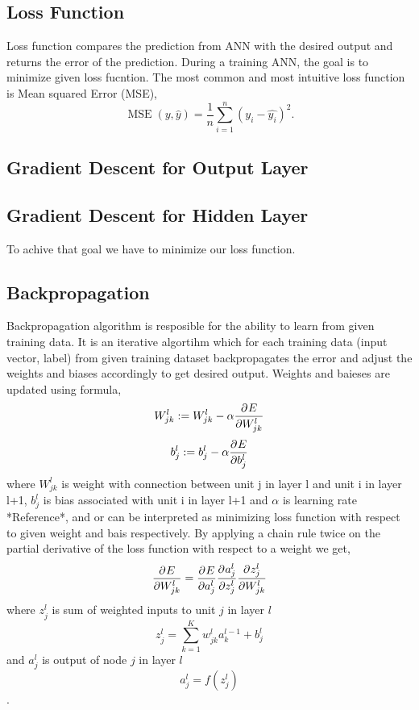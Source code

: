 \subsection{Loss Function}

Loss function compares the prediction from ANN with the desired output and returns the error of the prediction.
During a training ANN, the goal is to minimize given loss fucntion.
The most common and most intuitive loss function is Mean squared Error (MSE),
\[ \operatorname{MSE}(y, \hat{y}) = \frac{1}{n}\sum_{i=1}^n(y_i-\hat{y_i})^2. \]


\subsection{Gradient Descent for Output Layer}



\subsection{Gradient Descent for Hidden Layer}
To achive that goal we have to minimize our loss function.


\subsection{Backpropagation}

Backpropagation algorithm is resposible for the ability to learn from given training data.
It is an iterative algortihm which for each training data (input vector, label) from given training dataset backpropagates the error and adjust the weights and biases accordingly to get desired output.
\newline
Weights and baieses are updated using formula,
\[  W_{jk}^l := W_{jk}^l - \alpha\frac{\partial^{} E}{\partial W_{jk}^l} \]
\[ b_j^l := b_j^l - \alpha\frac{\partial^{} E}{\partial b_j^l} \]
where $W_{jk}^l$ is weight with connection between unit j in layer l and unit i in layer l+1, $b_j^l$ is bias associated with unit
i in layer l+1 and $\alpha$ is learning rate *Reference*, and  or  can be interpreted as minimizing loss function with respect to given weight and bais respectively.\newline
By applying a chain rule twice on the partial derivative of the loss function with respect to a weight we get,
\[  \frac{\partial^{} E}{\partial W_{jk}^l} = \frac{\partial^{} E}{\partial a_j^l}\frac{\partial^{} a_j^l}{\partial z_j^l}\frac{\partial^{} z_j^l}{\partial W_{jk}^l} \]
where $z_j^l$ is sum of weighted inputs to unit $j$ in layer $l$
\[  z_j^l =  \sum_{k=1}^K {w_{jk}^l}{a_k^{l-1}+b_j^l}  \]
and $a_j^l$ is output of node $j$ in layer $l$
\[  a_j^l =  f(z_j^l)  \].



